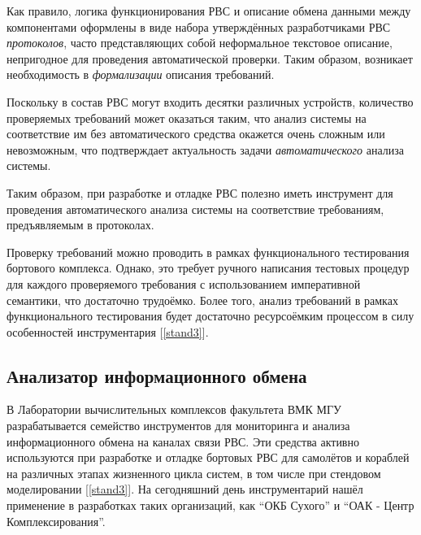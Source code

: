 Как правило, логика функционирования РВС и описание обмена данными между 
компонентами оформлены в виде набора утверждённых 
разработчиками РВС \textit{протоколов}, часто представляющих собой неформальное 
текстовое описание, непригодное для проведения автоматической проверки.
Таким образом, возникает необходимость в \textit{формализации} описания 
требований.

Поскольку в состав РВС могут входить десятки различных устройств, 
количество проверяемых требований может оказаться таким, что анализ 
системы на соответствие им без автоматического средства окажется очень сложным 
или невозможным, что подтверждает актуальность задачи \textit{автоматического} 
анализа системы.

Таким образом, при разработке и отладке РВС полезно иметь инструмент для 
проведения автоматического анализа системы на соответствие требованиям, 
предъявляемым в протоколах.

Проверку требований можно проводить в рамках функционального тестирования 
бортового комплекса. Однако, это требует ручного написания тестовых процедур 
для каждого проверяемого требования с использованием императивной семантики, 
что достаточно трудоёмко. Более того, анализ требований в рамках 
функционального тестирования будет достаточно ресурсоёмким процессом в силу 
особенностей инструментария [\ref{stand3}].

\subsection{Анализатор информационного обмена}

В Лаборатории вычислительных комплексов факультета ВМК МГУ разрабатывается 
семейство инструментов для мониторинга и анализа информационного обмена на 
каналах связи РВС. Эти средства активно используются при разработке и 
отладке бортовых РВС для самолётов и кораблей на различных этапах жизненного 
цикла систем, в том числе при стендовом моделировании [\ref{stand3}]. На 
сегодняшний день инструментарий нашёл применение в разработках таких 
организаций, как ``ОКБ Сухого'' и ``ОАК - Центр Комплексирования''.



